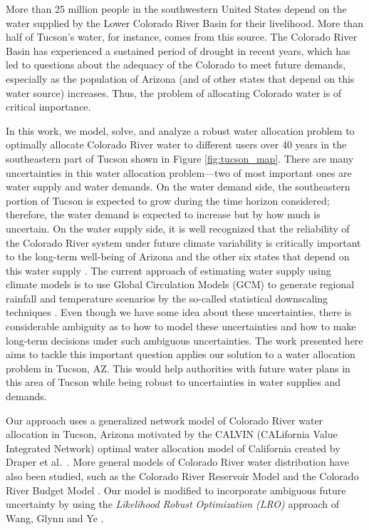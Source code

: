 \documentclass[12pt]{amsart}
\begin{document}
More than 25 million people in the southwestern United States depend on the water supplied by the Lower Colorado River Basin for their livelihood.
More than half of Tucson's water, for instance, comes from this source.
The Colorado River Basin has experienced a sustained period of drought in recent years, which has led to questions about the adequacy of the Colorado to meet future demands, especially as the population of Arizona (and of other states that depend on this water source) increases.
Thus, the problem of allocating Colorado water is of critical importance. 

In this work, we model, solve, and analyze a robust water allocation problem to optimally allocate Colorado River water to different users over 40 years in the southeastern part of Tucson shown in Figure \ref{fig:tucson_map}.
There are many uncertainties in this water allocation problem---two of most important ones are water supply and water demands.
On the water demand side, the southeastern portion of Tucson is expected to grow  during the time horizon considered; therefore, the water demand is expected to increase but by how much is uncertain.
On the water supply side, it is well recognized that the reliability of the Colorado River system under future climate variability is critically important to the long-term well-being of Arizona and the other six states that depend on this water supply \cite{usbr_colorado_climate}.
The current approach of estimating water supply using climate models is to use Global Circulation Models (GCM) to generate regional rainfall and temperature scenarios by the so-called statistical downscaling techniques \cite{christensen_lettenmaier_07,dibike_caulibaly_05}.
Even though we have some idea about these uncertainties, there is considerable ambiguity as to how to model these uncertainties and how to make long-term decisions under such ambiguous uncertainties.
The work presented here aims to tackle this important question applies our solution to a water allocation problem in Tucson, AZ.
This would help authorities with future water plans in this area of Tucson while being robust to uncertainties in water supplies and demands.

Our approach uses a generalized network model of Colorado River water allocation in Tucson, Arizona motivated by the CALVIN (CALifornia Value Integrated Network) optimal water allocation model of California created by Draper et al.\ \cite{draper_etal_03}.
More general models of Colorado River water distribution have also been studied, such as the Colorado River Reservoir Model \cite{christensen2004effects} and the Colorado River Budget Model \cite{barnett2009sustainable}.
Our model is modified to incorporate ambiguous future uncertainty by using the {\it Likelihood Robust Optimization (LRO)} approach of Wang, Glynn and Ye \cite{wang2010likelihood}.
\end{document}
